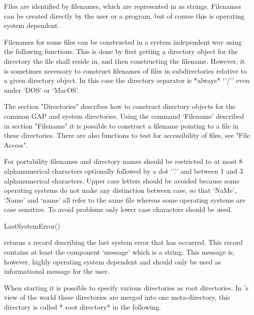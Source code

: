 
Files   are identified by filenames, which   are represented in {\GAP} as
strings.  Filenames can be created directly by the user or a program, but
of course this is operating system dependent.

Filenames for some files can  be constructed in  a system independent way
using the following functions.  This is done by first getting a directory
object for the directory the file shall  reside in, and then constructing
the filename.  However, it is  sometimes necessary to construct filenames
of files in subdirectories relative to a given directory object.  In this
case  the  directory separator is  *always*  `{'/'}' even under  `DOS' or
`MacOS'.

The  section "Directories" describes how  to  construct directory objects
for the common GAP and system  directories.  Using the command `Filename'
described in  section "Filename" it  is possible  to construct a filename
pointing to a  file in  these  directories.  There are  also functions to
test for accessibility of files, see "File Access".


For portability filenames and directory  names should be restricted to at
most   8 alphanumerical characters  optionally followed  by a dot `{'.'}'
and between 1 and 3 alphanumerical characters.  Upper case letters should
be  avoided because some  operating systems  do  not make any distinction
between case,  so that `NaMe', `Name'  and  `name' all  refer to the same
file  whereas  some   operating  systems are case   sensitive.   To avoid
problems only lower case characters should be used.

\>LastSystemError()

returns  a  record describing the   last system error that  has occurred.
This record   contains  at least   the  component  `message' which   is a
string. This message is, however,  highly operating system dependent  and
should only be used as informational message for the user.


When   starting {\GAP} it is possible   to specify various directories as
root directories.  In  {\GAP}'s view of  the world these  directories are
merged  into one meta-directory, this  directory  is called *{\GAP}  root
directory* in the following.

